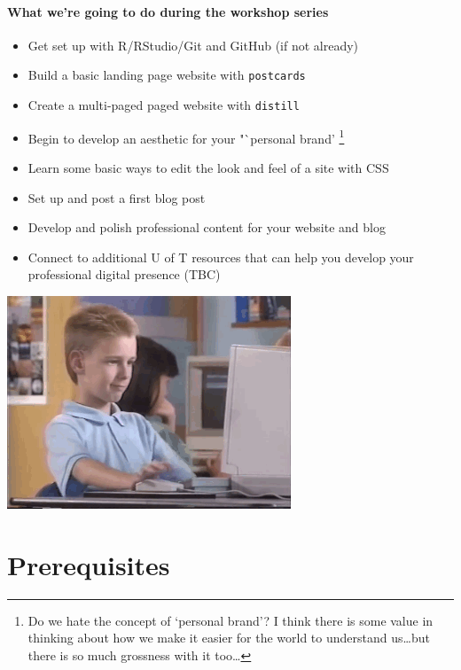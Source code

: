 \documentclass[
]{article}
\providecommand{\tightlist}{%
  \setlength{\itemsep}{0pt}\setlength{\parskip}{0pt}}
\begin{document}
\hypertarget{what-were-going-to-do-during-the-workshop-series}{%
\subsection{What we're going to do during the workshop series}\label{what-were-going-to-do-during-the-workshop-series}}

\begin{itemize}
\tightlist
\item
  Get set up with R/RStudio/Git and GitHub (if not already)
\item
  Build a basic landing page website with \texttt{postcards}
\item
  Create a multi-paged paged website with \texttt{distill}
\item
  Begin to develop an aesthetic for your "`personal brand' \footnote{Do we hate the concept of `personal brand'? I think there is some value in thinking about how we make it easier for the world to understand us\ldots but there is so much grossness with it too\ldots{}}
\item
  Learn some basic ways to edit the look and feel of a site with CSS
\item
  Set up and post a first blog post
\item
  Develop and polish professional content for your website and blog
\item
  Connect to additional U of T resources that can help you develop your professional digital presence (TBC)
\end{itemize}

\begin{center}\includegraphics{images/brentrambo} \end{center}

\hypertarget{part-prerequisites}{%
\part{Prerequisites}\label{part-prerequisites}}
\end{document}
